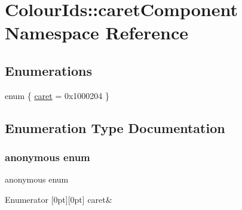 \hypertarget{namespaceColourIds_1_1caretComponent}{}\section{Colour\+Ids\+:\+:caret\+Component Namespace Reference}
\label{namespaceColourIds_1_1caretComponent}
\subsection*{Enumerations}
\begin{DoxyCompactItemize}
\item 
enum \{ \mbox{\hyperlink{namespaceColourIds_1_1caretComponent_ada0ff22702a98fb8dbb25ef1523194b8ad57569c6ce0688c19e3dafb200eb5705}{caret}} = 0x1000204
 \}
\end{DoxyCompactItemize}


\subsection{Enumeration Type Documentation}
\mbox{\label{namespaceColourIds_1_1caretComponent_ada0ff22702a98fb8dbb25ef1523194b8}} 
\subsubsection{\texorpdfstring{anonymous enum}{anonymous enum}}
{\footnotesize\ttfamily anonymous enum}

\begin{DoxyEnumFields}{Enumerator}
[0pt][0pt]{}\mbox{\label{namespaceColourIds_1_1caretComponent_ada0ff22702a98fb8dbb25ef1523194b8ad57569c6ce0688c19e3dafb200eb5705}} 
caret&\\
\hline

\end{DoxyEnumFields}
